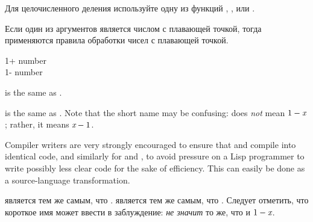 \begin{defun}[Function]
Для целочисленного деления используйте одну из функций  
, , 
или .

Если один из аргументов является числом с плавающей точкой, тогда применяются
правила обработки чисел с плавающей точкой.
\end{defun}

\begin{defun}[Function]
1+ number \\
1- number

 is the same as .

 is the same as .
Note that the short name may be confusing:  does \emph{not} mean
$1-\emph{x}$; rather, it means $\emph{x}-1$.

\beforenoterule
\begin{implementation}
Compiler writers are very strongly encouraged to ensure
that  and  compile into identical code, and
similarly for  and , to avoid pressure on a Lisp
programmer to write possibly less clear code for the sake of efficiency.
This can easily be done as a source-language transformation.
\end{implementation}
\afternoterule

 является тем же самым, что .
 является тем же самым, что .
Следует отметить, что короткое имя может ввести в заблуждение: 
 \emph{не значит} то же, что и $1-\emph{x}$.
\end{defun}

